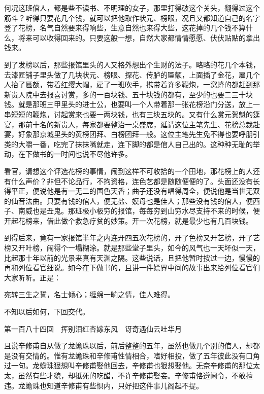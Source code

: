 \documentclass[12pt,UTF8]{ctexbook}
\begin{document}
{{{何况这班倌人，都是些不读书、不明理的女子，那里打得破这个关头，翻得过这个筋斗？听得只要花几个钱，就可以把他取作状元、榜眼，况且又都知道自己的名字登了花榜，名气自然要来得响些，生意自然也来得大些，这花掉的几个钱不算什么，将来可以收得回来的。只要这般一想，自然大家都情情愿愿、伏伏贴贴的拿出钱来。

到了发榜以后，那些报馆里头的人又格外想出个生财的法子。略略的花几个本钱，去漆匠铺子里头做了几块状元、榜眼、探花、传胪的匾额，上面插了金花，雇几个人抬了匾额，带着红缨大帽，雇了一班吹手，携带着许多鞭炮，一窝蜂的都赶到那新贵人院中去报喜讨赏，多的一百块钱、五十块钱的都有，至少的也要二三十块钱。就是那班三甲里头的进士公，也要叫一个人带着那一张花榜沿门分送，放上一串短短的鞭炮，讨起赏来也要一两块钱，也有三块五块的。又有什么赏元贺魁的筵宴，那前十名的新贵人，每家都要整治一桌盛席，延请这位主笔先生、花榜总裁赴宴，好象那京城里头的黄榜团拜、白榜团拜一般。这位主笔先生免不得也要呼朋引类的大嚼一番，吃完了抹抹嘴就走，连下脚的都是倌人自己出的。这种种无耻的举动，在下做书的一时间也说不尽他许多。

看官，请想这个评选花榜的事情，闹到这样不可收拾的一个田地，那花榜上的人还有什么声价？非但不论品行，不拘资格，连色艺都是随随便便的了。头面还没有长得平正，便说他是有一无二的国色天香；曲子还没有唱得周全，便说他是当世无双的仙音法曲。只要有钱的倌人，便无盐、嫫母也是佳人；那些没有钱的倌人，便西子、南威也是丑鬼。那班极小极穷的报馆，每每穷到山穷水尽支持不来的时候，便开起花榜来，借此做个救急疗贫的妙策。开一次花榜，就是最少也有几百块钱。

到得后来，竟有一家报馆半年之内连开四五次花榜的，开了色榜又开艺榜，开了艺榜又开叶榜，闹得个一塌糊涂。就是那些堂子里头，如今的风气也一天坏似一天，比起那十年以前的光景来真有天渊之隔。这些说话，且把他暂时按过一边，慢慢的再和列位看官细说。如今在下做书的，且讲一件嫖界中间的故事出来给列位看官们大家听听。正是：

宛转三生之誓，名士倾心；缠绵一晌之情，佳人难得。

不知以后如何，下回交代。





第一百八十四回　挥别泪红杏嫁东风　讶奇遇仙云吐华月





且说辛修甫自从做了龙蟾珠以后，前后整整的五年，虽然也做几个别的倌人，却都是没有交情的。惟有龙蟾珠和辛修甫性情相合，嗜好相投，做了五年彼此没有口角过一句。龙蟾珠狠想叫辛修甫娶他回去，辛修甫也狠想娶他。无奈辛修甫的那位太太，虽然有些才貌，却抵死的吃醋，不许辛修甫娶妾。辛修甫恪遵阃令，不敢擅违。龙蟾珠也知道辛修甫有些惧内，只好把这件事儿阁起不提。

}}}
\end{document}
